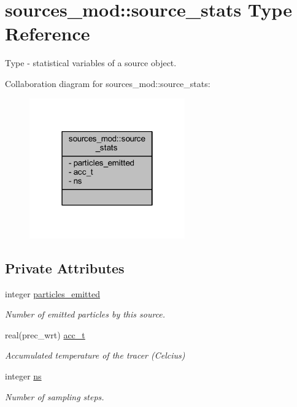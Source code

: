 \hypertarget{structsources__mod_1_1source__stats}{}\section{sources\+\_\+mod\+:\+:source\+\_\+stats Type Reference}
\label{structsources__mod_1_1source__stats}


Type -\/ statistical variables of a source object.  




Collaboration diagram for sources\+\_\+mod\+:\+:source\+\_\+stats\+:\nopagebreak
\begin{figure}[H]
\begin{center}
\leavevmode
\includegraphics[width=190pt]{structsources__mod_1_1source__stats__coll__graph}
\end{center}
\end{figure}
\subsection*{Private Attributes}
\begin{DoxyCompactItemize}
\item 
integer \mbox{\hyperlink{structsources__mod_1_1source__stats_a2253ced036ad1a9fee933b6b08135189}{particles\+\_\+emitted}}
\begin{DoxyCompactList}\small\item\em Number of emitted particles by this source. \end{DoxyCompactList}\item 
real(prec\+\_\+wrt) \mbox{\hyperlink{structsources__mod_1_1source__stats_a0b7d9fa17124a4e891bcfc00e39473e0}{acc\+\_\+t}}
\begin{DoxyCompactList}\small\item\em Accumulated temperature of the tracer (Celcius) \end{DoxyCompactList}\item 
integer \mbox{\hyperlink{structsources__mod_1_1source__stats_a77ba33fcefa55c8d8e440844ee7f4640}{ns}}
\begin{DoxyCompactList}\small\item\em Number of sampling steps. \end{DoxyCompactList}\end{DoxyCompactItemize}


